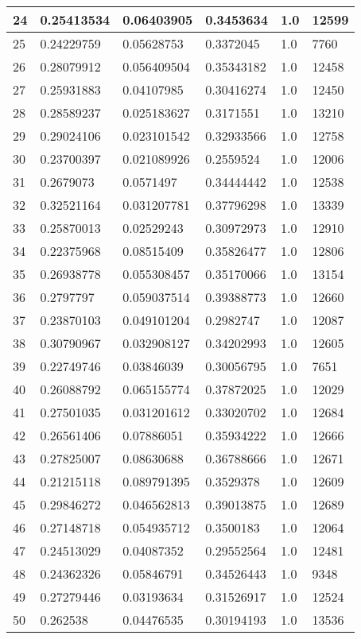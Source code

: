 \begin{longtable}{|l|l|l|l|l|l|}
24 & 0.25413534 & 0.06403905 & 0.3453634 & 1.0 & 12599 \\ \hline 
25 & 0.24229759 & 0.05628753 & 0.3372045 & 1.0 & 7760 \\ \hline 
26 & 0.28079912 & 0.056409504 & 0.35343182 & 1.0 & 12458 \\ \hline 
27 & 0.25931883 & 0.04107985 & 0.30416274 & 1.0 & 12450 \\ \hline 
28 & 0.28589237 & 0.025183627 & 0.3171551 & 1.0 & 13210 \\ \hline 
29 & 0.29024106 & 0.023101542 & 0.32933566 & 1.0 & 12758 \\ \hline 
30 & 0.23700397 & 0.021089926 & 0.2559524 & 1.0 & 12006 \\ \hline 
31 & 0.2679073 & 0.0571497 & 0.34444442 & 1.0 & 12538 \\ \hline 
32 & 0.32521164 & 0.031207781 & 0.37796298 & 1.0 & 13339 \\ \hline 
33 & 0.25870013 & 0.02529243 & 0.30972973 & 1.0 & 12910 \\ \hline 
34 & 0.22375968 & 0.08515409 & 0.35826477 & 1.0 & 12806 \\ \hline 
35 & 0.26938778 & 0.055308457 & 0.35170066 & 1.0 & 13154 \\ \hline 
36 & 0.2797797 & 0.059037514 & 0.39388773 & 1.0 & 12660 \\ \hline 
37 & 0.23870103 & 0.049101204 & 0.2982747 & 1.0 & 12087 \\ \hline 
38 & 0.30790967 & 0.032908127 & 0.34202993 & 1.0 & 12605 \\ \hline 
39 & 0.22749746 & 0.03846039 & 0.30056795 & 1.0 & 7651 \\ \hline 
40 & 0.26088792 & 0.065155774 & 0.37872025 & 1.0 & 12029 \\ \hline 
41 & 0.27501035 & 0.031201612 & 0.33020702 & 1.0 & 12684 \\ \hline 
42 & 0.26561406 & 0.07886051 & 0.35934222 & 1.0 & 12666 \\ \hline 
43 & 0.27825007 & 0.08630688 & 0.36788666 & 1.0 & 12671 \\ \hline 
44 & 0.21215118 & 0.089791395 & 0.3529378 & 1.0 & 12609 \\ \hline 
45 & 0.29846272 & 0.046562813 & 0.39013875 & 1.0 & 12689 \\ \hline 
46 & 0.27148718 & 0.054935712 & 0.3500183 & 1.0 & 12064 \\ \hline 
47 & 0.24513029 & 0.04087352 & 0.29552564 & 1.0 & 12481 \\ \hline 
48 & 0.24362326 & 0.05846791 & 0.34526443 & 1.0 & 9348 \\ \hline 
49 & 0.27279446 & 0.03193634 & 0.31526917 & 1.0 & 12524 \\ \hline 
50 & 0.262538 & 0.04476535 & 0.30194193 & 1.0 & 13536 \\ \hline 
\end{longtable}